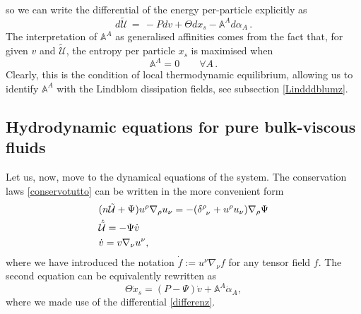 \documentclass[a4paper, amsfonts, amssymb, amsmath, reprint, twocolumn, showkeys, nofootinbib]{revtex4-2}
\begin{document}
so we can write the differential of the energy per-particle explicitly as
\begin{equation}\label{differenz}
d\tilde{\mathcal{U}} \, = \, -P dv + \Theta dx_s -\mathbb{A}^A d\alpha_A \, . 
\end{equation} 
The interpretation of $\mathbb{A}^A$ as generalised affinities \cite{PrigoginebookModernThermodynamics2014} comes from the fact that, for given $v$ and $\tilde{\mathcal{U}}$, the entropy per particle $x_s$ is maximised when
\begin{equation}\label{AAAAA}
\mathbb{A}^A=0   \quad \quad   \forall A \, .
\end{equation}
Clearly, this is the condition of local thermodynamic equilibrium, allowing us to identify $\mathbb{A}^A$ with the Lindblom dissipation fields, see subsection \ref{Lindddblumz}.



\subsection{Hydrodynamic equations for pure bulk-viscous fluids}

Let us, now, move to the dynamical equations of the system.
The conservation laws \eqref{conservotutto} can be written in the more convenient form
\begin{equation}\label{bulkino}
\begin{split}
& (n\tilde{\mathcal{U}} + \Psi) u^\rho \nabla_\rho u_\nu =- (\delta\indices{^\rho _\nu} + u^\rho u_\nu)\nabla_\rho \Psi   \\
& \dot{\tilde{\mathcal{U}}} =-\Psi \dot{v} \\
& \dot{v}=v \nabla_\nu u^\nu ,\\
\end{split}
\end{equation}
where we have introduced the notation $\dot{f}:= u^\nu \nabla_\nu f$ for any tensor field $f$. The second equation can be equivalently rewritten as
\begin{equation}\label{entropyIo}
\Theta \dot{x}_s = (P-\Psi)\dot{v} + \mathbb{A}^A \dot{\alpha}_A,
\end{equation} 
where we made use of the differential \eqref{differenz}.
\end{document}
